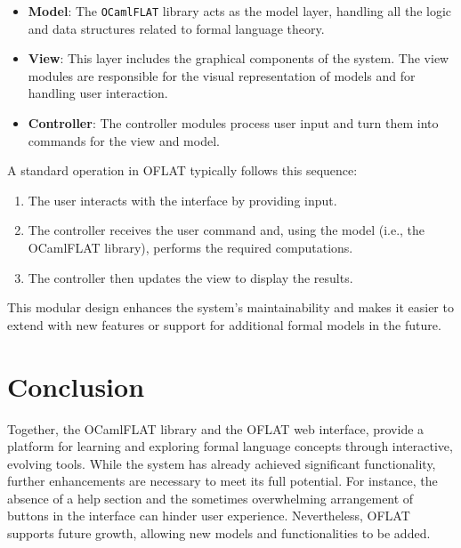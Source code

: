 \begin{itemize}
    \item \textbf{Model}: The \texttt{OCamlFLAT} library acts as the model layer, 
    handling all the logic and data structures related to formal language theory.
    \item \textbf{View}: This layer includes the graphical components of the system.
    The view modules are responsible for the visual representation of models and for handling user interaction.
    \item \textbf{Controller}: The controller modules process user input and turn them into commands for the view and model.
\end{itemize}
A standard operation in OFLAT typically follows this sequence:
\begin{enumerate}
    \item The user interacts with the interface by providing input.
    \item The controller receives the user command and, using the model (i.e., the OCamlFLAT library), performs the required computations.
    \item The controller then updates the view to display the results.
\end{enumerate}

This modular design enhances the system's maintainability and makes it easier to extend with new features or support for additional formal models in the future.

\section{Conclusion}

Together, the OCamlFLAT library and the OFLAT web interface, provide a platform for learning and exploring formal language concepts through interactive, evolving tools. 
While the system has already achieved significant functionality, further enhancements are necessary to meet its full potential. 
For instance, the absence of a help section and the sometimes overwhelming arrangement of buttons in the interface can hinder user experience.
Nevertheless, OFLAT supports future growth, allowing new models and functionalities to be added.

